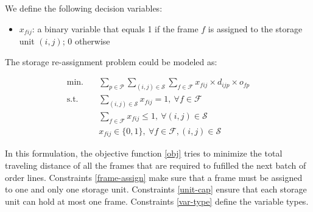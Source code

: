 \documentclass[a4, 11pt]{article}
\begin{document}
We define the following decision variables:

\begin{itemize}
	\item $x_{fij}$: a binary variable that equals 1 if the frame $f$ is assigned to the storage unit $(i, j)$; 0 otherwise
\end{itemize}


The storage re-assignment problem could be modeled as:


\begin{align}
	\text{min.} &\quad \sum_{p \in \mathcal{P}} \sum_{(i, j)  \in \mathcal{S}} \sum_{f \in \mathcal{F}} x_{fij} \times d_{ijp} \times o_{fp} \label{obj} \\
	\text{s.t.} &\quad \sum_{(i, j) \in \mathcal{S}} x_{fij} = 1, \ \forall f \in \mathcal{F} \label{frame-assign} \\
	&\quad \sum_{f \in \mathcal{F}} x_{fij} \leq 1, \ \forall (i, j) \in \mathcal{S} \label{unit-cap} \\
	&\quad x_{fij} \in \{0, 1\}, \ \forall f \in \mathcal{F}, (i, j) \in \mathcal{S} \label{var-type}
\end{align}

In this formulation, the objective function \eqref{obj} tries to minimize the total traveling distance of all the frames that are required to fufilled the next batch of order lines.
Constraints \eqref{frame-assign} make sure that a frame must be assigned to one and only one storage unit.
Constraints \eqref{unit-cap} ensure that each storage unit can hold at most one frame.
Constraints \eqref{var-type} define the variable types.

	
\end{document}
